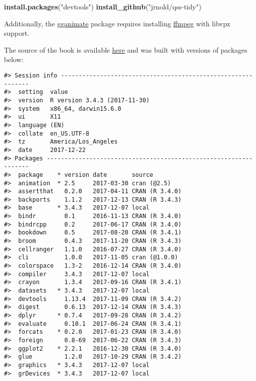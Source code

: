 \documentclass[]{book}
\newenvironment{Shaded}{\begin{snugshade}}{\end{snugshade}}
\newcommand{\KeywordTok}[1]{\textcolor[rgb]{0.13,0.29,0.53}{\textbf{#1}}}
\newcommand{\NormalTok}[1]{#1}
\newcommand{\StringTok}[1]{\textcolor[rgb]{0.31,0.60,0.02}{#1}}
\theoremstyle{definition}
\theoremstyle{definition}
\theoremstyle{definition}
\theoremstyle{remark}
\begin{document}
\begin{Shaded}
\begin{Highlighting}[]
\KeywordTok{install.packages}\NormalTok{(}\StringTok{"devtools"}\NormalTok{)}
\KeywordTok{install_github}\NormalTok{(}\StringTok{"jrnold/qss-tidy"}\NormalTok{)}
\end{Highlighting}
\end{Shaded}

Additionally, the
\href{https://cran.r-project.org/package=gganimate}{gganimate} package
requires installing \href{https://ffmpeg.org/}{ffmpeg} with libvpx
support.

The source of the book is available
\href{https://github.com/jrnold/qsstidy}{here} and was built with
versions of packages below:

\begin{verbatim}
#> Session info -------------------------------------------------------------
#>  setting  value                       
#>  version  R version 3.4.3 (2017-11-30)
#>  system   x86_64, darwin15.6.0        
#>  ui       X11                         
#>  language (EN)                        
#>  collate  en_US.UTF-8                 
#>  tz       America/Los_Angeles         
#>  date     2017-12-22
#> Packages -----------------------------------------------------------------
#>  package    * version date       source        
#>  animation  * 2.5     2017-03-30 cran (@2.5)   
#>  assertthat   0.2.0   2017-04-11 CRAN (R 3.4.0)
#>  backports    1.1.2   2017-12-13 CRAN (R 3.4.3)
#>  base       * 3.4.3   2017-12-07 local         
#>  bindr        0.1     2016-11-13 CRAN (R 3.4.0)
#>  bindrcpp     0.2     2017-06-17 CRAN (R 3.4.0)
#>  bookdown     0.5     2017-08-20 CRAN (R 3.4.1)
#>  broom        0.4.3   2017-11-20 CRAN (R 3.4.3)
#>  cellranger   1.1.0   2016-07-27 CRAN (R 3.4.0)
#>  cli          1.0.0   2017-11-05 cran (@1.0.0) 
#>  colorspace   1.3-2   2016-12-14 CRAN (R 3.4.0)
#>  compiler     3.4.3   2017-12-07 local         
#>  crayon       1.3.4   2017-09-16 CRAN (R 3.4.1)
#>  datasets   * 3.4.3   2017-12-07 local         
#>  devtools     1.13.4  2017-11-09 CRAN (R 3.4.2)
#>  digest       0.6.13  2017-12-14 CRAN (R 3.4.3)
#>  dplyr      * 0.7.4   2017-09-28 CRAN (R 3.4.2)
#>  evaluate     0.10.1  2017-06-24 CRAN (R 3.4.1)
#>  forcats    * 0.2.0   2017-01-23 CRAN (R 3.4.0)
#>  foreign      0.8-69  2017-06-22 CRAN (R 3.4.3)
#>  ggplot2    * 2.2.1   2016-12-30 CRAN (R 3.4.0)
#>  glue         1.2.0   2017-10-29 CRAN (R 3.4.2)
#>  graphics   * 3.4.3   2017-12-07 local         
#>  grDevices  * 3.4.3   2017-12-07 local         

\end{verbatim}
\end{document}
